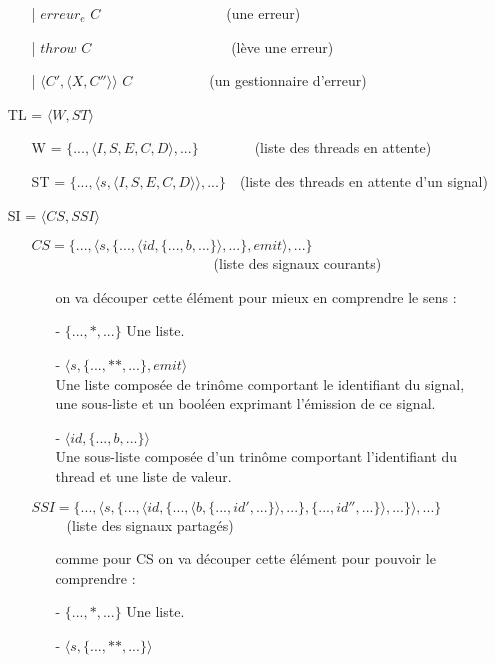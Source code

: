 \documentclass[10pt,a4paper]{article}
\begin{document}
\begin{itemize}
\begin{itemize}
					\item[|] $erreur_{e}$ $C$~~~~~~~~~~~~~~~~~~(une erreur)
					\item[|] $throw$ $C$~~~~~~~~~~~~~~~~~~~~(lève une erreur)
					\item[|] $\langle C',\langle X,C''\rangle\rangle$ $C$~~~~~~~~~~~(un gestionnaire d'erreur)
				\end{itemize}
				\item[] TL = $\langle W,ST\rangle$
				\begin{itemize}
					\item[] W = $\{...,\langle I,S,E,C,D\rangle,...\}$~~~~~~~~(liste des threads en attente)
					\item[] ST = $\{...,\langle s,\langle I,S,E,C,D\rangle\rangle,...\}$~~(liste des threads en attente d'un signal)
				\end{itemize}
				\item[] SI = $\langle CS,SSI\rangle$
				\begin{itemize}
					\item[] $CS = \{...,\langle s,\{...,\langle id,\{...,b,...\}\rangle,...\},emit\rangle,...\}$~~~~~~~~~~~~~~~~~~~~~~~~~~(liste des signaux courants)
					\begin{itemize}
						\item [] on va découper cette élément pour mieux en comprendre le sens :
						\item[] - $\{...,*,...\}$ Une liste. 
						\item[] - $\langle s,\{...,**,...\},emit\rangle$ \\
						Une liste composée de trinôme comportant le identifiant du signal, une sous-liste et un booléen exprimant l'émission de ce signal.
						\item[] - $\langle id,\{...,b,...\}\rangle$ \\
						Une sous-liste composée d'un trinôme comportant l'identifiant du thread et une liste de valeur.
					\end{itemize}
					\item[]
					\item[] $SSI =  \{...,\langle s,\{...,\langle id,\{...,\langle b,\{...,id',...\}\rangle,...\},\{...,id'',...\}\rangle,...\}\rangle,...\}$~~~~~(liste des signaux partagés)
					\begin{itemize}
						\item[] comme pour CS on va découper cette élément pour pouvoir le comprendre :
						\item[] - $\{...,*,...\}$ Une liste. 
						\item[] - $\langle s,\{...,**,...\}\rangle$\\

\end{itemize}
\end{itemize}
\end{itemize}
\end{document}
